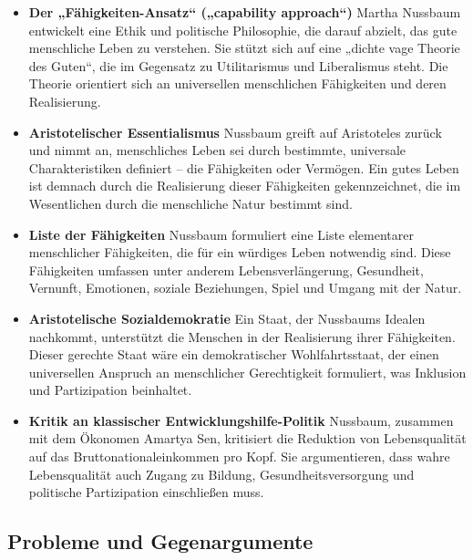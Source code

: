 \documentclass{article}
\begin{document}
\begin{itemize}
	\item \textbf{Der „Fähigkeiten-Ansatz“ („capability approach“)}
	      Martha Nussbaum entwickelt eine Ethik und politische Philosophie, die darauf abzielt, das gute menschliche Leben zu verstehen. Sie stützt sich auf eine „dichte vage Theorie des Guten“, die im Gegensatz zu Utilitarismus und Liberalismus steht. Die Theorie orientiert sich an universellen menschlichen Fähigkeiten und deren Realisierung.

	\item \textbf{Aristotelischer Essentialismus}
	      Nussbaum greift auf Aristoteles zurück und nimmt an, menschliches Leben sei durch bestimmte, universale Charakteristiken definiert – die Fähigkeiten oder Vermögen. Ein gutes Leben ist demnach durch die Realisierung dieser Fähigkeiten gekennzeichnet, die im Wesentlichen durch die menschliche Natur bestimmt sind.

	\item \textbf{Liste der Fähigkeiten}
	      Nussbaum formuliert eine Liste elementarer menschlicher Fähigkeiten, die für ein würdiges Leben notwendig sind. Diese Fähigkeiten umfassen unter anderem Lebensverlängerung, Gesundheit, Vernunft, Emotionen, soziale Beziehungen, Spiel und Umgang mit der Natur.

	\item \textbf{Aristotelische Sozialdemokratie}
	      Ein Staat, der Nussbaums Idealen nachkommt, unterstützt die Menschen in der Realisierung ihrer Fähigkeiten. Dieser gerechte Staat wäre ein demokratischer Wohlfahrtsstaat, der einen universellen Anspruch an menschlicher Gerechtigkeit formuliert, was Inklusion und Partizipation beinhaltet.

	\item \textbf{Kritik an klassischer Entwicklungshilfe-Politik}
	      Nussbaum, zusammen mit dem Ökonomen Amartya Sen, kritisiert die Reduktion von Lebensqualität auf das Bruttonationaleinkommen pro Kopf. Sie argumentieren, dass wahre Lebensqualität auch Zugang zu Bildung, Gesundheitsversorgung und politische Partizipation einschließen muss.
\end{itemize}

\subsection{Probleme und Gegenargumente}
\end{document}
